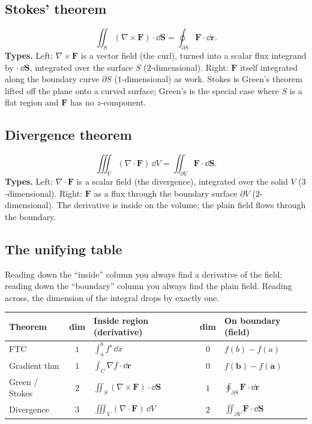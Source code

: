 \documentclass{essay}
\newcommand{\F}{\mathbf{F}}
\begin{document}
\subsection{Stokes' theorem}

\[ \iint_{S} (\nabla\times\F)\cdot\dd\mathbf{S} = \oint_{\partial S} \F\cdot\dd\mathbf{r}. \]
\textbf{Types.} Left: \(\nabla\times\F\) is a vector field (the curl), turned into a
scalar flux integrand by \(\cdot\,\dd\mathbf{S}\), integrated over the surface \(S\)
(\(2\)-dimensional). Right: \(\F\) itself integrated along the boundary curve
\(\partial S\) (\(1\)-dimensional) as work. Stokes is Green's theorem lifted off the
plane onto a curved surface; Green's is the special case where \(S\) is a flat region
and \(\F\) has no \(z\)-component.

\subsection{Divergence theorem}

\[ \iiint_{V} (\nabla\cdot\F)\,\dd V = \iint_{\partial V} \F\cdot\dd\mathbf{S}. \]
\textbf{Types.} Left: \(\nabla\cdot\F\) is a scalar field (the divergence), integrated
over the solid \(V\) (\(3\)-dimensional). Right: \(\F\) as a flux through the boundary
surface \(\partial V\) (\(2\)-dimensional). The derivative is inside on the volume; the
plain field flows through the boundary.

\subsection{The unifying table}

Reading down the ``inside'' column you always find a derivative of the field; reading
down the ``boundary'' column you always find the plain field. Reading across, the
dimension of the integral drops by exactly one.

\begin{center}
  \renewcommand{\arraystretch}{1.5}
  \begin{tabular}{@{}l c l c l@{}}
    \toprule
    \textbf{Theorem} & \textbf{dim} & \textbf{Inside region (derivative)} & \textbf{dim} & \textbf{On boundary (field)} \\
    \midrule
    FTC               & \(1\) & \(\displaystyle\int_{a}^{b} f'\,\dd x\) & \(0\) & \(f(b)-f(a)\) \\
    Gradient thm      & \(1\) & \(\displaystyle\int_{C} \nabla f\cdot\dd\mathbf{r}\) & \(0\) & \(f(\mathbf{b})-f(\mathbf{a})\) \\
    Green / Stokes    & \(2\) & \(\displaystyle\iint_{S} (\nabla\times\F)\cdot\dd\mathbf{S}\) & \(1\) & \(\displaystyle\oint_{\partial S}\F\cdot\dd\mathbf{r}\) \\
    Divergence        & \(3\) & \(\displaystyle\iiint_{V} (\nabla\cdot\F)\,\dd V\) & \(2\) & \(\displaystyle\iint_{\partial V}\F\cdot\dd\mathbf{S}\) \\
    \bottomrule
  \end{tabular}
\end{center}
\end{document}
